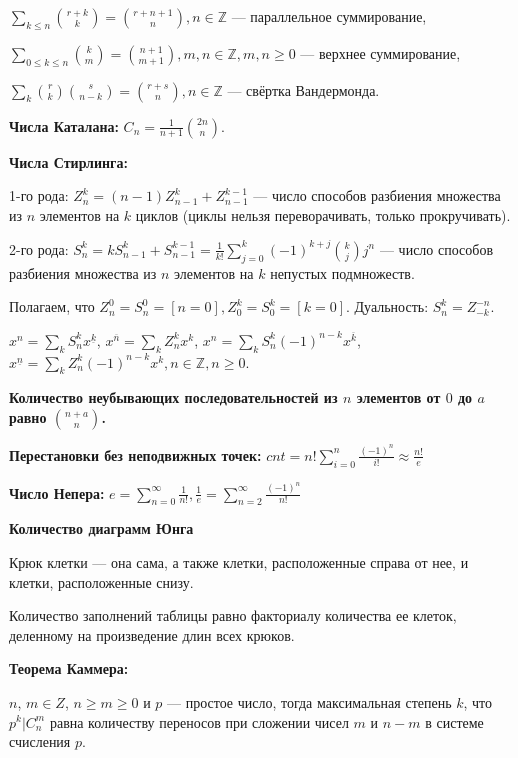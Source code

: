 $\sum\limits_{k\le n} \binom{r+k}{k}=\binom{r+n+1}{n}, n\in \mathbb{Z}$ --- параллельное суммирование,

$\sum\limits_{0\le k\le n} \binom{k}{m} = \binom{n+1}{m+1}, m, n\in \mathbb{Z}, m, n\ge 0$ --- верхнее суммирование,

$\sum\limits_k \binom{r}{k}\binom{s}{n-k}=\binom{r+s}{n}, n\in \mathbb{Z}$ --- свёртка Вандермонда.

\textbf{Числа Каталана:} $\displaystyle C_n = \frac1{n + 1}\binom{2n}{n}$.

\textbf{Числа Стирлинга:}

1-го рода: $Z_n^k =(n-1)Z_{n - 1}^k + Z_{n-1}^{k-1}$ --- число способов разбиения множества из $n$ элементов на $k$ циклов (циклы нельзя переворачивать, только прокручивать).

2-го рода: $S_n^k = kS_{n - 1}^k + S_{n-1}^{k-1} = \frac1{k!} \sum\limits_{j=0}^k (-1)^{k+j}\binom{k}{j}j^n$ --- число способов разбиения множества из $n$ элементов на $k$ непустых подмножеств.

Полагаем, что $Z_n^0=S_n^0=[n=0], Z_0^k=S_0^k=[k=0]$. Дуальность: $S_n^k=Z_{-k}^{-n}$.

$x^n=\sum\limits_k S_n^k x^{\underline{k}}$,
$x^{\overline{n}}=\sum\limits_k Z_n^k x^k$,
$x^n=\sum\limits_k S_n^k (-1)^{n-k} x^{\overline{k}}$,
$x^{\underline{n}}=\sum\limits_k Z_n^k (-1)^{n-k} x^k, n\in \mathbb{Z}, n \ge 0$.

\textbf{Количество неубывающих последовательностей из $n$ элементов от $0$ до $a$ равно $\binom{n + a}{n}$.}

\textbf{Перестановки без неподвижных точек:} $cnt = n! \sum\limits_{i = 0}^n \frac{(-1)^n}{i!} \approx \frac{n!}e$

\textbf{Число Непера:} $e = \sum\limits_{n = 0}^\infty \frac1{n!}, \frac1e = \sum\limits_{n = 2}^\infty \frac{(-1)^n}{n!}$

\textbf{Количество диаграмм Юнга}

Крюк клетки --- она сама, а также клетки, расположенные справа от нее, и клетки, расположенные снизу.

Количество заполнений таблицы равно факториалу количества ее клеток, деленному на произведение длин всех крюков.

\textbf{Теорема Каммера:}

$n$, $m\in Z$, $n\geq  m\geq  0$ и $p$ --- простое число, тогда максимальная степень $k$, что $p^k | C_n^m$ равна количеству переносов при сложении чисел $m$ и $n - m$ в системе счисления $p$.


